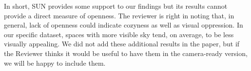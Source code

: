 \documentclass{paper}
\begin{document}

\noindent In short, SUN provides some support to our findings but its results cannot provide a direct measure of openness. The reviewer is right in noting that, in general, lack of openness could indicate cozyness as well as visual oppression. In our specific dataset, spaces with more visible sky tend, on average, to be less visually appealing. We did not add these additional results in the paper, but if the Reviewer thinks it would be useful to have them in the camera-ready version, we will be happy to include them.




\end{document}
